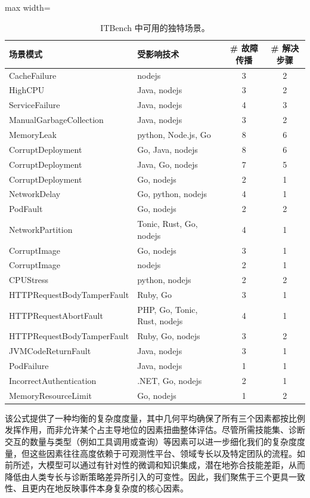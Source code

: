 \documentclass[10pt,UTF8,fontset=fandol]{ctexart}
\begin{document}
\begin{table}[H]
\centering
\caption{ITBench 中可用的独特场景。}
\label{tab:itb12}
\begin{adjustbox}{max width=\linewidth}
\begin{tabular}{@{}l l c c@{}}
\toprule
\textbf{场景模式} & \textbf{受影响技术} & \textbf{\# 故障传播} & \textbf{\# 解决步骤} \\
\midrule
CacheFailure & nodejs & 3 & 2 \\
HighCPU & Java, nodejs & 3 & 2 \\
ServiceFailure & Java, nodejs & 4 & 3 \\
ManualGarbageCollection & Java, nodejs & 3 & 2 \\
MemoryLeak & python, Node.js, Go & 8 & 6 \\
CorruptDeployment & Go, Java, nodejs & 8 & 6 \\
CorruptDeployment & Java, Go, nodejs & 7 & 5 \\
CorruptDeployment & Go, nodejs & 2 & 1 \\
NetworkDelay & Go, python, nodejs & 4 & 1 \\
PodFault & Go, nodejs & 2 & 2 \\
NetworkPartition & Tonic, Rust, Go, nodejs & 4 & 1 \\
CorruptImage & Go, nodejs & 3 & 1 \\
CorruptImage & nodejs & 2 & 1 \\
CPUStress & python, nodejs & 2 & 2 \\
HTTPRequestBodyTamperFault & Ruby, Go & 3 & 1 \\
HTTPRequestAbortFault & PHP, Go, Tonic, Rust, nodejs & 4 & 1 \\
HTTPRequestBodyTamperFault & Ruby, Go, nodejs & 3 & 2 \\
JVMCodeReturnFault & Java, nodejs & 3 & 1 \\
PodFailure & Java, nodejs & 1 & 1 \\
IncorrectAuthentication & .NET, Go, nodejs & 2 & 1 \\
MemoryResourceLimit & Go, nodejs & 1 & 2 \\
\bottomrule
\end{tabular}
\end{adjustbox}
\end{table}

该公式提供了一种均衡的复杂度度量，其中几何平均确保了所有三个因素都按比例发挥作用，而非允许某个占主导地位的因素扭曲整体评估。尽管所需技能集、诊断交互的数量与类型（例如工具调用或查询）等因素可以进一步细化我们的复杂度度量，但这些因素往往高度依赖于可观测性平台、领域专长以及特定团队的流程。如前所述，大模型可以通过有针对性的微调和知识集成，潜在地弥合技能差距，从而降低由人类专长与诊断策略差异所引入的可变性。因此，我们聚焦于三个更具一致性、且更内在地反映事件本身复杂度的核心因素。
\end{document}
